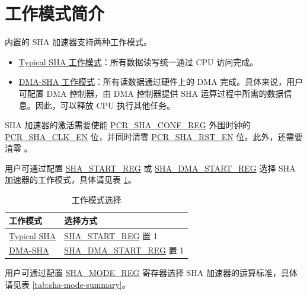 \documentclass[main\_\_CN.tex]{subfiles}
\begin{document}
\section{工作模式简介}
\chipname{} 内置的 SHA 加速器支持两种工作模式。

\begin{itemize}
    \item \hyperref[sec:sha-typical-sha]{Typical SHA 工作模式}：所有数据读写统一通过 CPU 访问完成。
    \item \hyperref[sec:sha-dma-sha]{DMA-SHA 工作模式}：所有读数据通过硬件上的 DMA 完成。具体来说，用户可配置 DMA 控制器，由 DMA 控制器提供 SHA 运算过程中所需的数据信息。因此，可以释放 CPU 执行其他任务。
\end{itemize}

SHA 加速器的激活需要使能 \hyperref[regdesc:PCRSHACONFREG]{PCR\_SHA\_CONF\_REG} 外围时钟的 \hyperref[fielddesc:PCRSHACLKEN]{PCR\_SHA\_CLK\_EN} 位，并同时清零 \hyperref[fielddesc:PCRSHARSTEN]{PCR\_SHA\_RST\_EN} 位。此外，还需要清零 。


用户可通过配置 \hyperref[regdesc:SHASTARTREG]{SHA\_START\_REG} 或 \hyperref[regdesc:SHADMASTARTREG]{SHA\_DMA\_START\_REG} 选择 SHA 加速器的工作模式，具体请见表 \ref{tab:sha-hash-algo-select}。

\begin{longtable}[c]{ |l|l| }
\caption{工作模式选择}
\label{tab:sha-hash-algo-select}
\\\hline
\rowcolor{lightgray}
\textbf{工作模式}      & \textbf{选择方式}\\
    \hline
    \hyperref[sec:sha-typical-sha]{Typical SHA}      &  \hyperref[regdesc:SHASTARTREG]{SHA\_START\_REG} 置 1   \\
    \hline
    \hyperref[sec:sha-dma-sha]{DMA-SHA}           &  \hyperref[regdesc:SHADMASTARTREG]{SHA\_DMA\_START\_REG} 置 1   \\
    \hline
\end{longtable}


用户可通过配置 \hyperref[regdesc:SHAMODEREG]{SHA\_MODE\_REG} 寄存器选择 SHA 加速器的运算标准，具体请见表 \ref{tab:sha-mode-summary}。
\end{document}
